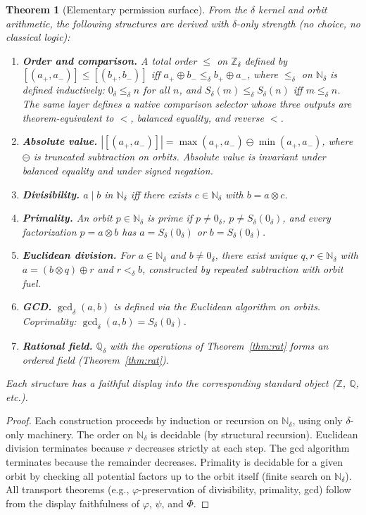 \documentclass[11pt,a4paper]{article}
\newtheorem{theorem}{Theorem}[section]
\theoremstyle{definition}
\theoremstyle{remark}
\begin{document}
\begin{theorem}[Elementary permission surface]\label{thm:permission}
From the $\delta$ kernel and orbit arithmetic, the following structures are
derived with $\delta$-only strength (no choice, no classical logic):
\begin{enumerate}[leftmargin=2em, label=\textup{(\alph*)}]
  \item \textbf{Order and comparison.} A total order $\leq$ on
    $\mathbb{Z}_\delta$ defined
    by $[(a_+, a_-)] \leq [(b_+, b_-)]$ iff $a_+ \oplus b_- \leq_\delta
    b_+ \oplus a_-$, where $\leq_\delta$ on $\mathbb{N}_\delta$ is defined
    inductively: $0_\delta \leq_\delta n$ for all $n$, and
    $S_\delta(m) \leq_\delta S_\delta(n)$ iff $m \leq_\delta n$. The same
    layer defines a native comparison selector whose three outputs are
    theorem-equivalent to $<$, balanced equality, and reverse $<$.
  \item \textbf{Absolute value.} $|[(a_+, a_-)]| = \max(a_+, a_-) \ominus
    \min(a_+, a_-)$, where $\ominus$ is truncated subtraction on orbits.
    Absolute value is invariant under balanced equality and under signed
    negation.
  \item \textbf{Divisibility.} $a \mid b$ in $\mathbb{N}_\delta$ iff there
    exists $c \in \mathbb{N}_\delta$ with $b = a \otimes c$.
  \item \textbf{Primality.} An orbit $p \in \mathbb{N}_\delta$ is
    \emph{prime} if $p \neq 0_\delta$, $p \neq S_\delta(0_\delta)$, and
    every factorization $p = a \otimes b$ has $a = S_\delta(0_\delta)$ or
    $b = S_\delta(0_\delta)$.
  \item \textbf{Euclidean division.} For $a \in \mathbb{N}_\delta$ and
    $b \neq 0_\delta$, there exist unique $q, r \in \mathbb{N}_\delta$ with
    $a = (b \otimes q) \oplus r$ and $r <_\delta b$, constructed by
    repeated subtraction with orbit fuel.
  \item \textbf{GCD.} $\gcd_\delta(a, b)$ is defined via the Euclidean
    algorithm on orbits. Coprimality:
    $\gcd_\delta(a,b) = S_\delta(0_\delta)$.
  \item \textbf{Rational field.} $\mathbb{Q}_\delta$ with the operations of
    Theorem~\ref{thm:rat} forms an ordered field
    (Theorem~\ref{thm:rat}).
\end{enumerate}
Each structure has a faithful display into the corresponding standard object
($\mathbb{Z}$, $\mathbb{Q}$, etc.).
\end{theorem}

\begin{proof}
Each construction proceeds by induction or recursion on $\mathbb{N}_\delta$,
using only $\delta$-only machinery. The order on $\mathbb{N}_\delta$ is
decidable (by structural recursion). Euclidean division terminates because $r$
decreases strictly at each step. The gcd algorithm terminates because the
remainder decreases. Primality is decidable for a given orbit by checking all
potential factors up to the orbit itself (finite search on $\mathbb{N}_\delta$).
All transport theorems (e.g., $\varphi$-preservation of divisibility, primality,
gcd) follow from the display faithfulness of $\varphi$, $\psi$, and $\Phi$.
\end{proof}
\end{document}

